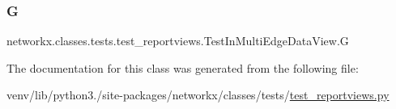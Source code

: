 \subsubsection{\texorpdfstring{G}{G}}
{\footnotesize\ttfamily networkx.\+classes.\+tests.\+test\+\_\+reportviews.\+Test\+In\+Multi\+Edge\+Data\+View.\+G}



The documentation for this class was generated from the following file\+:\begin{DoxyCompactItemize}
\item 
venv/lib/python3./site-\/packages/networkx/classes/tests/\hyperlink{test__reportviews_8py}{test\+\_\+reportviews.\+py}\end{DoxyCompactItemize}
